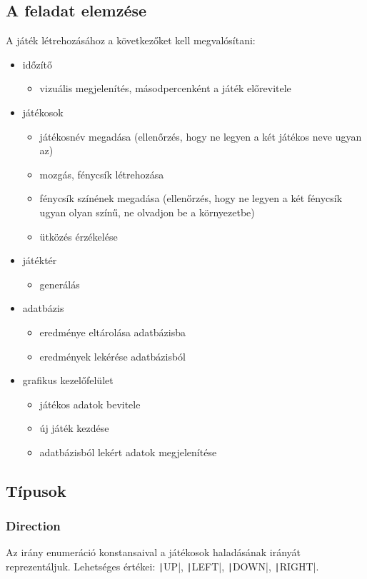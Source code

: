 \documentclass[a4paper,12pt]{article}
\begin{document}
	\subsection{A feladat elemzése}
	A játék létrehozásához a következőket kell megvalósítani:
	\begin{itemize}
		\item időzítő
		\begin{itemize}
			\item vizuális megjelenítés, másodpercenként a játék előrevitele
		\end{itemize}
		\item játékosok
		\begin{itemize}
			\item játékosnév megadása (ellenőrzés, hogy ne legyen a két játékos neve ugyan az)
			\item mozgás, fénycsík létrehozása
			\item fénycsík színének megadása (ellenőrzés, hogy ne legyen a két fénycsík ugyan olyan színű, ne olvadjon be a környezetbe)
			\item ütközés érzékelése
		\end{itemize}
		\item játéktér
		\begin{itemize}
			\item generálás
		\end{itemize}
		\item adatbázis
		\begin{itemize}
			\item eredménye eltárolása adatbázisba
			\item eredmények lekérése adatbázisból
		\end{itemize}
		\item grafikus kezelőfelület
		\begin{itemize}
			\item játékos adatok bevitele
			\item új játék kezdése
			\item adatbázisból lekért adatok megjelenítése
		\end{itemize}
	\end{itemize}
	\subsection{Típusok}
	\subsubsection{Direction}
	Az irány enumeráció konstansaival a játékosok haladásának irányát reprezentáljuk. Lehetséges értékei: \texttt|UP|, \texttt|LEFT|, \texttt|DOWN|, \texttt|RIGHT|.
\end{document}
